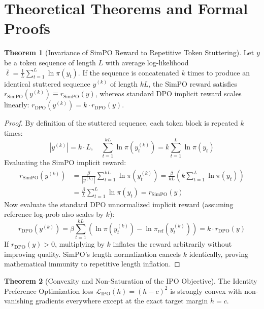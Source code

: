\documentclass[11pt,a4paper]{article}
\theoremstyle{definition}
\newtheorem{theorem}{\textbf{Theorem}}[section]
\begin{document}
\section{Theoretical Theorems and Formal Proofs}

\begin{theorem}[Invariance of SimPO Reward to Repetitive Token Stuttering]
Let $y$ be a token sequence of length $L$ with average log-likelihood $\bar{\ell} = \frac{1}{L}\sum_{t=1}^L \ln \pi(y_t)$. If the sequence is concatenated $k$ times to produce an identical stuttered sequence $y^{(k)}$ of length $kL$, the SimPO reward satisfies $r_{\text{SimPO}}(y^{(k)}) \equiv r_{\text{SimPO}}(y)$, whereas standard DPO implicit reward scales linearly: $r_{\text{DPO}}(y^{(k)}) = k \cdot r_{\text{DPO}}(y)$.
\end{theorem}

\begin{proof}
By definition of the stuttered sequence, each token block is repeated $k$ times:
{\boldmath
\begin{equation}
|y^{(k)}| = k \cdot L, \quad \sum_{t=1}^{kL} \ln \pi(y_t^{(k)}) = k \sum_{t=1}^L \ln \pi(y_t)
\end{equation}
}
Evaluating the SimPO implicit reward:
{\boldmath
\begin{align}
r_{\text{SimPO}}(y^{(k)}) &= \frac{\beta}{|y^{(k)}|} \sum_{t=1}^{kL} \ln \pi(y_t^{(k)}) = \frac{\beta}{kL} \left( k \sum_{t=1}^L \ln \pi(y_t) \right) \\
&= \frac{\beta}{L} \sum_{t=1}^L \ln \pi(y_t) = r_{\text{SimPO}}(y)
\end{align}
}
Now evaluate the standard DPO unnormalized implicit reward (assuming reference log-prob also scales by $k$):
{\boldmath
\begin{equation}
r_{\text{DPO}}(y^{(k)}) = \beta \sum_{t=1}^{kL} \left( \ln \pi(y_t^{(k)}) - \ln \pi_{\text{ref}}(y_t^{(k)}) \right) = k \cdot r_{\text{DPO}}(y)
\end{equation}
}
If $r_{\text{DPO}}(y) > 0$, multiplying by $k$ inflates the reward arbitrarily without improving quality. SimPO's length normalization cancels $k$ identically, proving mathematical immunity to repetitive length inflation.
\end{proof}

\begin{theorem}[Convexity and Non-Saturation of the IPO Objective]
The Identity Preference Optimization loss $\mathcal{L}_{\text{IPO}}(h) = (h - c)^2$ is strongly convex with non-vanishing gradients everywhere except at the exact target margin $h = c$.
\end{theorem}
\end{document}
